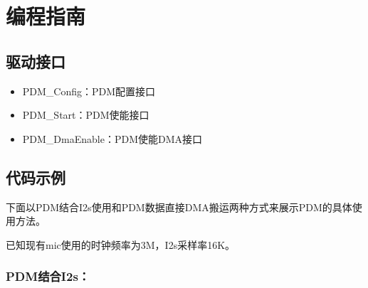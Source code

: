 \documentclass[
  12pt,
]{book}
\begin{document}
\hypertarget{ux7f16ux7a0bux6307ux5357-3}{%
\section{编程指南}\label{ux7f16ux7a0bux6307ux5357-3}}

\hypertarget{ux9a71ux52a8ux63a5ux53e3-3}{%
\subsection{驱动接口}\label{ux9a71ux52a8ux63a5ux53e3-3}}

\begin{itemize}
\item
  PDM\_Config：PDM配置接口
\item
  PDM\_Start：PDM使能接口
\item
  PDM\_DmaEnable：PDM使能DMA接口
\end{itemize}

\hypertarget{ux4ee3ux7801ux793aux4f8b-3}{%
\subsection{代码示例}\label{ux4ee3ux7801ux793aux4f8b-3}}

下面以PDM结合I2s使用和PDM数据直接DMA搬运两种方式来展示PDM的具体使用方法。

已知现有mic使用的时钟频率为3M，I2s采样率16K。

\hypertarget{pdmux7ed3ux5408i2s}{%
\subsubsection{PDM结合I2s：}\label{pdmux7ed3ux5408i2s}}
\end{document}
